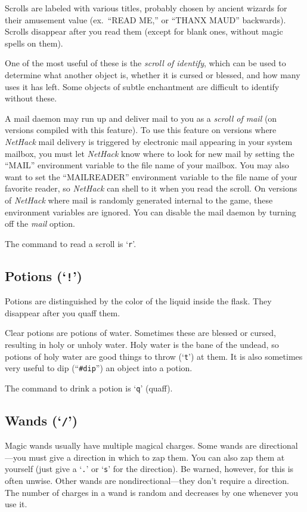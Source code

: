 Scrolls are labeled with various titles, probably chosen by ancient wizards
for their amusement value (ex.\ ``READ ME,'' or ``THANX MAUD'' backwards).
Scrolls disappear after you read them (except for blank ones, without
magic spells on them).

One of the most useful of these is the %
{\it scroll of identify}, which
can be used to determine what another object is, whether it is cursed or
blessed, and how many uses it has left.  Some objects of subtle
enchantment are difficult to identify without these.

A mail daemon may run up and deliver mail to you as a %
{\it scroll of mail} (on versions compiled with this feature).
To use this feature on versions where {\it NetHack\/}
mail delivery is triggered by electronic mail appearing in your system mailbox,
you must let {\it NetHack\/} know where to look for new mail by setting the
``MAIL'' environment variable to the file name of your mailbox.
You may also want to set the ``MAILREADER'' environment variable to the
file name of your favorite reader, so {\it NetHack\/} can shell to it when you
read the scroll.
On versions of {\it NetHack\/} where mail is randomly
generated internal to the game, these environment variables are ignored.
You can disable the mail daemon by turning off the
{\it mail\/} option.

The command to read a scroll is `{\tt r}'.

\subsection*{Potions (`{\tt !}')}

Potions are distinguished by the color of the liquid inside the flask.
They disappear after you quaff them.

Clear potions are potions of water.  Sometimes these are
blessed or cursed, resulting in holy or unholy water.  Holy water is
the bane of the undead, so potions of holy water are good things to
throw (`{\tt t}') at them.  It is also sometimes very useful to dip
(``{\tt \#dip}'') an object into a potion.

The command to drink a potion is `{\tt q}' (quaff).

\subsection*{Wands (`{\tt /}')}

Magic wands usually have multiple magical charges.  Some wands are
directional---you must give a direction in which to zap them.  You can also
zap them at yourself (just give a `{\tt .}' or `{\tt s}' for the direction).
Be warned, however, for this is often unwise.  Other wands are
nondirectional---they don't require a direction.  The number of charges in a
wand is random and decreases by one whenever you use it.

